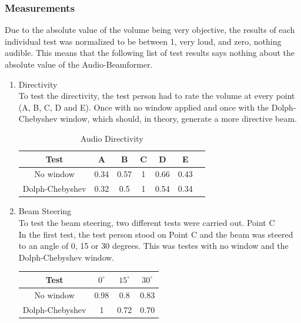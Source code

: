 \subsubsection{Measurements}
Due to the absolute value of the volume being very objective, the results of each individual test was normalized to be between 1, very loud, and zero, nothing audible. This means that the following list of test results says nothing about the absolute value of the Audio-Beamformer.
\begin{enumerate}
    \item Directivity \\
    To test the directivity, the test person had to rate the volume at every point (A, B, C, D and E). Once with no window applied and once with the Dolph-Chebyshev window, which should, in theory, generate a more directive beam.
    \begin{center}
     \begin{table}[h!]
    \centering
    \begin{tabular}{ |c|c|c|c|c|c|c}
      \hline 
      Test & A & B & C & D & E \\ 
      \hline
     No window & 0.34 & 0.57 & 1 & 0.66 & 0.43 \\
     \hline
     Dolph-Chebyshev & 0.32 & 0.5 & 1 & 0.54 & 0.34 \\
     \hline
    \end{tabular}
    \caption{Audio Directivity}
    \label{6.1.2_tab:music_audio_volume_directivity}
    \end{table}   
    \end{center}
    \item Beam Steering \\
    To test the beam steering, two different tests were carried out.
    \subitem Point C\\
    In the first test, the test person stood on Point C and the beam was steered to an angle of 0, 15 or 30 degrees. This was testes with no window and the Dolph-Chebyshev window.
    \begin{center}
     \begin{table}[h!]
    \centering
    \begin{tabular}{ |c|c|c|c|}
      \hline 
      Test & $0^\circ$ & $15^\circ$ & $30^\circ$ \\ 
      \hline
     No window & 0.98 & 0.8 & 0.83 \\
     \hline
     Dolph-Chebyshev & 1 & 0.72 & 0.70 \\
     \hline
    \end{tabular}

\end{table}
\end{center}
\end{enumerate}
